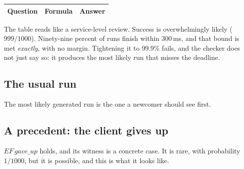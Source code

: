 \begin{heretable}
\small
\begin{tabular}{p{.3\linewidth}p{.3\linewidth}p{.32\linewidth}}
\textbf{Question} & \textbf{Formula} & \textbf{Answer}\\
\hline

\end{tabular}
\caption{Every answer is computed from the task and the declared overlay. The
first row uses the core alone.}
\label{tab:overlay-answers}
\end{heretable}

The table reads like a service-level review. Success is overwhelmingly likely
($999/1000$). Ninety-nine percent of runs finish within 300\,ms, and that
bound is met \emph{exactly}, with no margin. Tightening it to 99.9\% fails, and
the checker does not just say so: it produces the most likely run that misses
the deadline.

\subsection{The usual run}

The most likely generated run is the one a newcomer should see first.

\begin{herefigure}
\caption{The most likely run: one request and one response, 45\,ms, probability
$9/10$.}
\label{fig:overlay-run-usual}
\end{herefigure}

\subsection{A precedent: the client gives up}

$EF\,\mathit{gave\_up}$ holds, and its witness is a concrete case. It is rare,
with probability $1/1000$, but it is possible, and this is what it looks like.

\begin{herefigure}
\caption{The witness for $EF\,\mathit{gave\_up}$: three timeouts, 615\,ms,
probability $1/1000$.}
\label{fig:overlay-run-giveup}
\end{herefigure}


